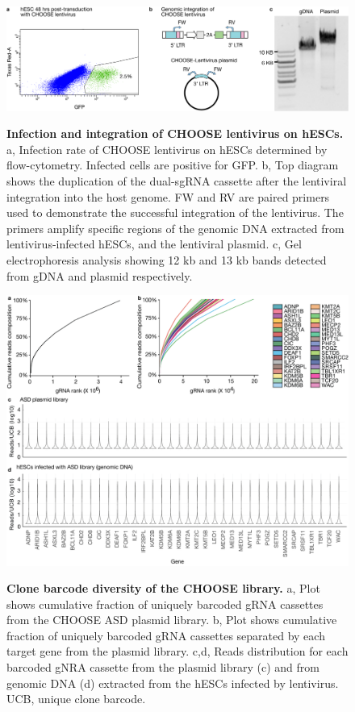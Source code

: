 \begin{figure}[h!]
    \centering
	\includegraphics[width=\textwidth]{figures/asd/Figure_S2}
    \label{fig:asdS2}
    \caption{\textbf{Infection and integration of CHOOSE lentivirus on hESCs.} 
    a, Infection rate of CHOOSE lentivirus on hESCs determined by flow-cytometry. Infected cells are positive for GFP. b, Top diagram shows the duplication of the dual-sgRNA cassette after the lentiviral integration into the host genome. FW and RV are paired primers used to demonstrate the successful integration of the lentivirus. The primers amplify specific regions of the genomic DNA extracted from lentivirus-infected hESCs, and the lentiviral plasmid. c, Gel electrophoresis analysis showing 12 kb and 13 kb bands detected from gDNA and plasmid respectively.}
\end{figure}


\begin{figure}[h!]
    \centering
	\includegraphics[width=\textwidth]{figures/asd/Figure_S3}
    \label{fig:asdS3}
    \caption{\textbf{Clone barcode diversity of the CHOOSE library.} 
    a, Plot shows cumulative fraction of uniquely barcoded gRNA cassettes from the CHOOSE ASD plasmid library. b, Plot shows cumulative fraction of uniquely barcoded gRNA cassettes separated by each target gene from the plasmid library. c,d, Reads distribution for each barcoded gNRA cassette from the  plasmid library (c) and from genomic DNA (d) extracted from the hESCs infected by lentivirus. UCB, unique clone barcode.}
\end{figure}



